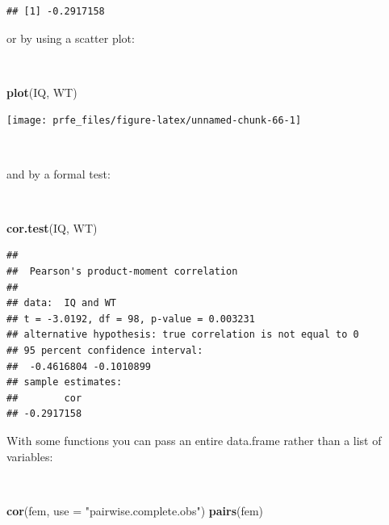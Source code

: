 \documentclass[12pt,a4paper]{book}
\newenvironment{Shaded}{\begin{snugshade}}{\end{snugshade}}
\newcommand{\DataTypeTok}[1]{\textcolor[rgb]{0.13,0.29,0.53}{#1}}
\newcommand{\KeywordTok}[1]{\textcolor[rgb]{0.13,0.29,0.53}{\textbf{#1}}}
\newcommand{\NormalTok}[1]{#1}
\newcommand{\StringTok}[1]{\textcolor[rgb]{0.31,0.60,0.02}{#1}}
\theoremstyle{definition}
\theoremstyle{definition}
\theoremstyle{definition}
\theoremstyle{remark}
\begin{document}
\begin{verbatim}
## [1] -0.2917158
\end{verbatim}

\newpage

or by using a scatter plot:

~

\begin{Shaded}
\begin{Highlighting}[]
\KeywordTok{plot}\NormalTok{(IQ, WT)}
\end{Highlighting}
\end{Shaded}

\begin{center}\texttt{[image: prfe\_files/figure-latex/unnamed-chunk-66-1]} \end{center}

~

and by a formal test:

~

\begin{Shaded}
\begin{Highlighting}[]
\KeywordTok{cor.test}\NormalTok{(IQ, WT)}
\end{Highlighting}
\end{Shaded}

\begin{verbatim}
## 
##  Pearson's product-moment correlation
## 
## data:  IQ and WT
## t = -3.0192, df = 98, p-value = 0.003231
## alternative hypothesis: true correlation is not equal to 0
## 95 percent confidence interval:
##  -0.4616804 -0.1010899
## sample estimates:
##        cor 
## -0.2917158
\end{verbatim}

\newpage

With some functions you can pass an entire data.frame rather than a list
of variables:

~

\begin{Shaded}
\begin{Highlighting}[]
\KeywordTok{cor}\NormalTok{(fem, }\DataTypeTok{use =} \StringTok{"pairwise.complete.obs"}\NormalTok{)}
\KeywordTok{pairs}\NormalTok{(fem)}
\end{Highlighting}
\end{Shaded}
\end{document}
